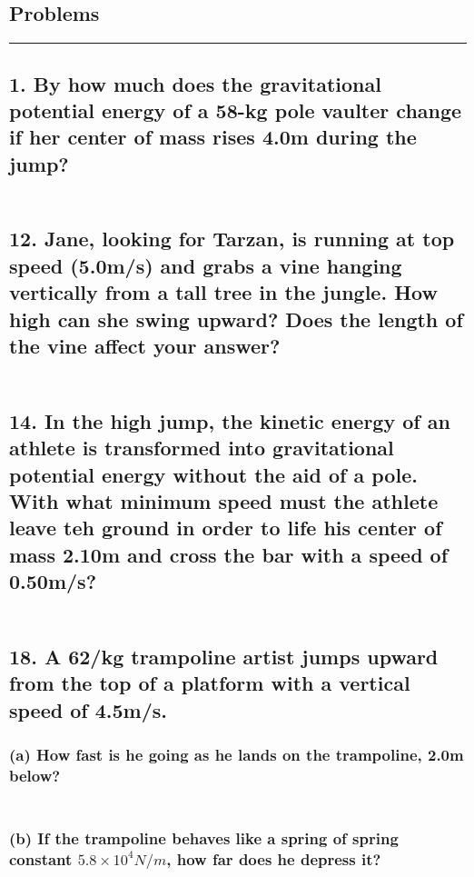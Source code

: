 \documentclass[12pt,a4paper,english]{article}
\begin{document}
\begin{flushleft}
  \section*{Problems}
  \hrule
  \subsection{1. By how much does the gravitational potential energy of a 58-kg pole vaulter change if her center of mass rises 4.0m during the jump?}
  \begin{align*}
  \end{align*}
  \subsection{12. Jane, looking for Tarzan, is running at top speed (5.0m/s) and grabs a vine hanging vertically from a tall tree in the jungle. How high can she swing upward? Does the length of the vine affect your answer?}
  \begin{align*}
  \end{align*}
  \subsection{14. In the high jump, the kinetic energy of an athlete is transformed into gravitational potential energy without the aid of a pole. With what minimum speed must the athlete leave teh ground in order to life his center of mass 2.10m and cross the bar with a speed of 0.50m/s?}
  \begin{align*}
  \end{align*}
  \subsection{18. A 62/kg trampoline artist jumps upward from the top of a platform with a vertical speed of 4.5m/s.}
  \subsubsection{(a) How fast is he going as he lands on the trampoline, 2.0m below?}
  \begin{align*}
  \end{align*}
  \subsubsection{(b) If the trampoline behaves like a spring of spring constant $5.8\times10^4N/m$, how far does he depress it?}
  \begin{align*}
  \end{align*}

\end{flushleft}
\end{document}

